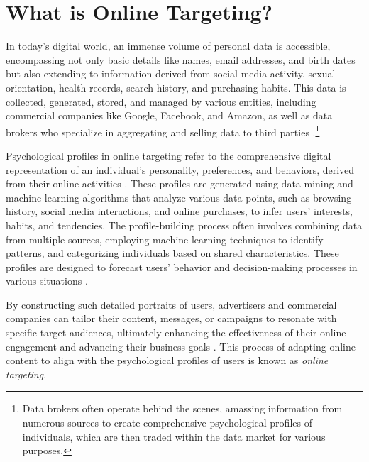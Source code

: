 \documentclass[preprint]{acmart}
\begin{document}
\section{What is Online Targeting?}

In today's digital world, an immense volume of personal data is accessible, encompassing not only basic details like names, email addresses, and birth dates but also extending to information derived from social media activity, sexual orientation, health records, search history, and purchasing habits. This data is collected, generated, stored, and managed by various entities, including commercial companies like Google, Facebook, and Amazon, as well as data brokers who specialize in aggregating and selling data to third parties \cite{anthes2015,Crain2018}.\footnote{Data brokers often operate behind the scenes, amassing information from numerous sources to create comprehensive psychological profiles of individuals, which are then traded within the data market for various purposes.}


Psychological profiles in online targeting refer to the comprehensive digital representation of an individual's personality, preferences, and behaviors, derived from their online activities \cite{boerman2017online}. These profiles are generated using data mining and machine learning algorithms that analyze various data points, such as browsing history, social media interactions, and online purchases, to infer users' interests, habits, and tendencies. The profile-building process often involves combining data from multiple sources, employing machine learning techniques to identify patterns, and categorizing individuals based on shared characteristics. These profiles are designed to forecast users' behavior and decision-making processes in various situations \cite{Koene2015}. 


By constructing such detailed portraits of users, advertisers and commercial companies can tailor their content, messages, or campaigns to resonate with specific target audiences, ultimately enhancing the effectiveness of their online engagement \cite{Beer2019} and advancing their business goals \cite{Susserand2019,matz2017psychological}. This process of adapting online content to align with the psychological profiles of users is known as \textit{online targeting}. 
\end{document}
